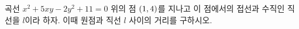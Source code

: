 곡선 $x^2+5xy-2y^2+11=0$ 위의 점 $(1{,}\mkern3mu\mathopen{}4)$를 지나고 이 점에서의 접선과 수직인 직선을 $l$이라 하자. 이때 원점과 직선 $l$ 사이의 거리를 구하시오.
